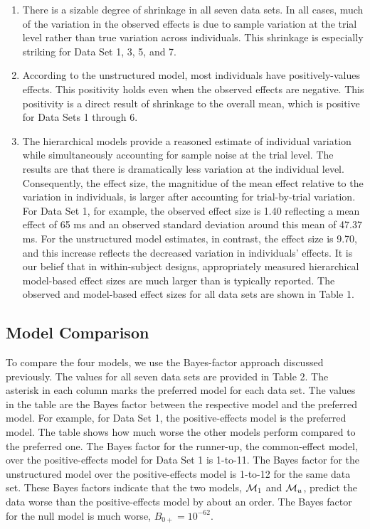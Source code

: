 \documentclass[american,man]{apa6}
\begin{document}
\begin{enumerate}
\def\labelenumi{\arabic{enumi}.}
\item
  There is a sizable degree of shrinkage in all seven data sets. In all
  cases, much of the variation in the observed effects is due to sample
  variation at the trial level rather than true variation across
  individuals. This shrinkage is especially striking for Data Set 1, 3,
  5, and 7.
\item
  According to the unstructured model, most individuals have
  positively-values effects. This positivity holds even when the
  observed effects are negative. This positivity is a direct result of
  shrinkage to the overall mean, which is positive for Data Sets 1
  through 6.
\item
  The hierarchical models provide a reasoned estimate of individual
  variation while simultaneously accounting for sample noise at the
  trial level. The results are that there is dramatically less variation
  at the individual level. Consequently, the effect size, the magnitidue
  of the mean effect relative to the variation in individuals, is larger
  after accounting for trial-by-trial variation. For Data Set 1, for
  example, the observed effect size is 1.40 reflecting a mean effect of
  65 ms and an observed standard deviation around this mean of 47.37 ms.
  For the unstructured model estimates, in contrast, the effect size is
  9.70, and this increase reflects the decreased variation in
  individuals' effects. It is our belief that in within-subject designs,
  appropriately measured hierarchical model-based effect sizes are much
  larger than is typically reported. The observed and model-based effect
  sizes for all data sets are shown in Table 1.
\end{enumerate}

\subsection{Model Comparison}\label{model-comparison-1}

To compare the four models, we use the Bayes-factor approach discussed
previously. The values for all seven data sets are provided in Table 2.
The asterisk in each column marks the preferred model for each data set.
The values in the table are the Bayes factor between the respective
model and the preferred model. For example, for Data Set 1, the
positive-effects model is the preferred model. The table shows how much
worse the other models perform compared to the preferred one. The Bayes
factor for the runner-up, the common-effect model, over the
positive-effects model for Data Set 1 is 1-to-11. The Bayes factor for
the unstructured model over the positive-effects model is 1-to-12 for
the same data set. These Bayes factors indicate that the two models,
\({\cal M}_1\) and \({\cal M}_u\), predict the data worse than the
positive-effects model by about an order. The Bayes factor for the null
model is much worse, \(B_{0+} = 10^{-62}\).
\end{document}
